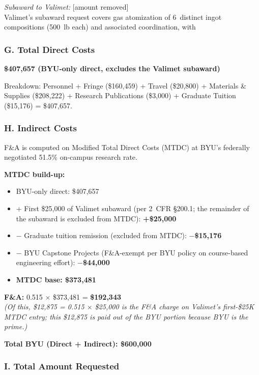 \documentclass[11pt,letterpaper]{article}
\begin{document}
\textit{Subaward to Valimet:} [amount removed] \\
Valimet's subaward request covers gas atomization of 6~distinct ingot
compositions (500~lb each) and associated coordination, with 

\subsubsection*{G. Total Direct Costs}

\textbf{\$407,657 (BYU-only direct, excludes the Valimet subaward)}

Breakdown: Personnel + Fringe (\$160,459) + Travel (\$20,800) +
Materials \& Supplies (\$208,222) + Research Publications (\$3,000)
+ Graduate Tuition (\$15,176) = \$407,657.

\subsubsection*{H. Indirect Costs}

F\&A is computed on Modified Total Direct Costs (MTDC) at BYU's
federally negotiated 51.5\% on-campus research rate.

\textbf{MTDC build-up:}
\begin{itemize}\setlength{\itemsep}{0pt}
  \item BYU-only direct: \$407,657
  \item + First \$25,000 of Valimet subaward (per 2~CFR \S200.1;
  the remainder of the subaward is excluded from
  MTDC): \textbf{+\$25,000}
  \item $-$ Graduate tuition remission (excluded from MTDC):
  \textbf{$-$\$15,176}
  \item $-$ BYU Capstone Projects (F\&A-exempt per BYU policy on
  course-based engineering effort): \textbf{$-$\$44,000}
  \item \textbf{MTDC base: \$373,481}
\end{itemize}

\textbf{F\&A:} 0.515 $\times$ \$373,481 = \textbf{\$192,343}\\
\textit{(Of this, \$12,875 = 0.515 $\times$ \$25,000 is the F\&A
charge on Valimet's first-\$25K MTDC entry; this \$12,875 is paid
out of the BYU portion because BYU is the prime.)}

\textbf{Total BYU (Direct + Indirect): \$600,000}

\subsubsection*{I. Total Amount Requested}
\end{document}
